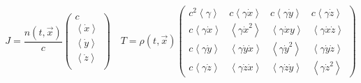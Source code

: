 \documentclass[11pt]{article}
\numberwithin{equation}{section}
\begin{document}
\[
  J= \frac{n(t,\vec{x})}{c}
  \begin{pmatrix}
    c \\
    \left< \dot{x} \right> \\
    \left< \dot{y} \right> \\
    \left< \dot{z} \right> \\
  \end{pmatrix}\quad
  T= \rho(t,\vec{x})
  \begin{pmatrix}
    c^2 \left< \gamma \right> & c \left< \gamma \dot{x} \right> &  c \left< \gamma \dot{y} \right> & c \left< \gamma \dot{z} \right> \\
     c \left< \gamma \dot{x} \right> & \left< \gamma \dot{x}^2 \right> &  \left< \gamma \dot{x}y \right> &  \left< \gamma \dot{x} \dot{z} \right>  \\
     c \left< \gamma \dot{y} \right> &  \left< \gamma \dot{y} \dot{x} \right>&  \left< \gamma \dot{y}^2 \right> &  \left< \gamma \dot{y} \dot{z} \right>  \\
     c \left< \gamma \dot{z} \right> &  \left< \gamma \dot{z}\dot{x} \right>& \left< \gamma \dot{z}\dot{y} \right> &  \left< \gamma \dot{z}^2 \right> 
  \end{pmatrix}
\]
\end{document}
